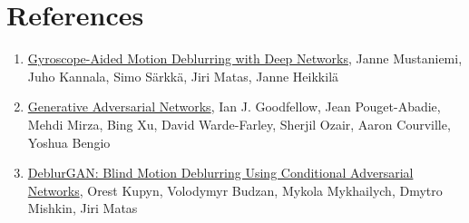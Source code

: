 \documentclass[10pt,twocolumn,letterpaper]{article}
\begin{document}
\section{References}
\begin{enumerate}
    \item \href{https://arxiv.org/abs/1810.00986}{Gyroscope-Aided Motion Deblurring with Deep Networks}, Janne Mustaniemi, Juho Kannala, Simo Särkkä, Jiri Matas, Janne Heikkilä
    \item \href{https://arxiv.org/abs/1406.2661}{Generative Adversarial Networks},
Ian J. Goodfellow, Jean Pouget-Abadie, Mehdi Mirza, Bing Xu, David Warde-Farley, Sherjil Ozair, Aaron Courville, Yoshua Bengio
    \item \href{https://arxiv.org/abs/1711.07064}{DeblurGAN: Blind Motion Deblurring Using Conditional Adversarial Networks},
Orest Kupyn, Volodymyr Budzan, Mykola Mykhailych, Dmytro Mishkin, Jiri Matas
\end{enumerate}


{\small


}
\end{document}
